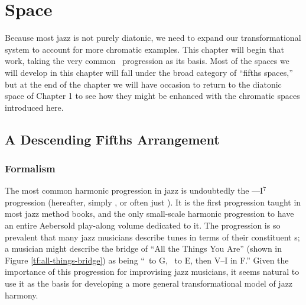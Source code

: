 
\chapter{\tf Space}
\label{chap:tf-space}


%
%
Because most jazz is not purely diatonic, we need to expand our
transformational system to account for more chromatic examples. This chapter
will begin that work, taking the very common \tfo\ progression as its basis.
Most of the spaces we will develop in this chapter will fall under the broad
category of “fifths spaces,” but at the end of the chapter we will have
occasion to return to the diatonic space of Chapter 1 to see how they might be
enhanced with the chromatic spaces introduced here.

\section{A Descending Fifths Arrangement}
\label{sec:tf-space-1}

\subsection{Formalism}

The most common harmonic progression in jazz is undoubtedly the
\mbox{\ii--\V--I$^7$} progression (hereafter, simply \tfo, or
often just \tf). It is the first progression taught in most jazz method books,
and the only small-scale harmonic progression to have an entire Aebersold
play-along volume dedicated to it. The progression is so prevalent
that many jazz musicians describe tunes in terms of their constituent \tf{}s;
a musician might describe the bridge of “All the Things You Are” (shown in
Figure \ref{tf:all-things-bridge}) as being “\tf\ to G, \tf\ to E, then V--I
in F.” Given the importance of this progression for improvising jazz
musicians, it seems natural to use it as the basis for developing
a more general transformational model of jazz harmony.

